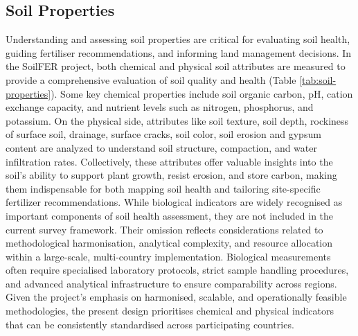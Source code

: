 \documentclass[
  10pt,
  b5paper,
  oneside]{book}
\begin{document}
\subsection{Soil Properties}\label{soil-properties}

Understanding and assessing soil properties are critical for evaluating soil health, guiding fertiliser recommendations, and informing land management decisions. In the SoilFER project, both chemical and physical soil attributes are measured to provide a comprehensive evaluation of soil quality and health (Table \ref{tab:soil-properties}). Some key chemical properties include soil organic carbon, pH, cation exchange capacity, and nutrient levels such as nitrogen, phosphorus, and potassium. On the physical side, attributes like soil texture, soil depth, rockiness of surface soil, drainage, surface cracks, soil color, soil erosion and gypsum content are analyzed to understand soil structure, compaction, and water infiltration rates. Collectively, these attributes offer valuable insights into the soil's ability to support plant growth, resist erosion, and store carbon, making them indispensable for both mapping soil health and tailoring site-specific fertilizer recommendations. While biological indicators are widely recognised as important components of soil health assessment, they are not included in the current survey framework. Their omission reflects considerations related to methodological harmonisation, analytical complexity, and resource allocation within a large-scale, multi-country implementation. Biological measurements often require specialised laboratory protocols, strict sample handling procedures, and advanced analytical infrastructure to ensure comparability across regions. Given the project's emphasis on harmonised, scalable, and operationally feasible methodologies, the present design prioritises chemical and physical indicators that can be consistently standardised across participating countries.
\end{document}

